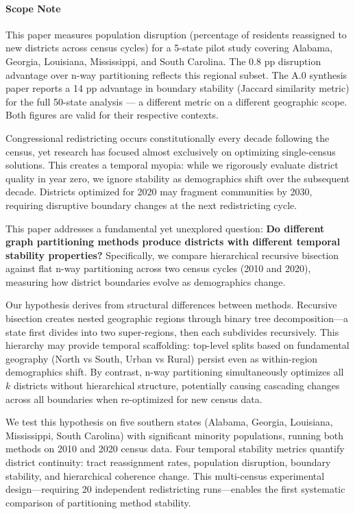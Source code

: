 \paragraph{Scope Note} This paper measures population disruption (percentage of residents reassigned to new districts across census cycles) for a 5-state pilot study covering Alabama, Georgia, Louisiana, Mississippi, and South Carolina. The 0.8 pp disruption advantage over n-way partitioning reflects this regional subset. The A.0 synthesis paper reports a 14 pp advantage in boundary stability (Jaccard similarity metric) for the full 50-state analysis --- a different metric on a different geographic scope. Both figures are valid for their respective contexts.

Congressional redistricting occurs constitutionally every decade following the census, yet research has focused almost exclusively on optimizing single-census solutions. This creates a temporal myopia: while we rigorously evaluate district quality in year zero, we ignore stability as demographics shift over the subsequent decade. Districts optimized for 2020 may fragment communities by 2030, requiring disruptive boundary changes at the next redistricting cycle.

This paper addresses a fundamental yet unexplored question: \textbf{Do different graph partitioning methods produce districts with different temporal stability properties?} Specifically, we compare hierarchical recursive bisection against flat n-way partitioning across two census cycles (2010 and 2020), measuring how district boundaries evolve as demographics change.

Our hypothesis derives from structural differences between methods. Recursive bisection creates nested geographic regions through binary tree decomposition—a state first divides into two super-regions, then each subdivides recursively. This hierarchy may provide temporal scaffolding: top-level splits based on fundamental geography (North vs South, Urban vs Rural) persist even as within-region demographics shift. By contrast, n-way partitioning simultaneously optimizes all $k$ districts without hierarchical structure, potentially causing cascading changes across all boundaries when re-optimized for new census data.

We test this hypothesis on five southern states (Alabama, Georgia, Louisiana, Mississippi, South Carolina) with significant minority populations, running both methods on 2010 and 2020 census data. Four temporal stability metrics quantify district continuity: tract reassignment rates, population disruption, boundary stability, and hierarchical coherence change. This multi-census experimental design—requiring 20 independent redistricting runs—enables the first systematic comparison of partitioning method stability.

